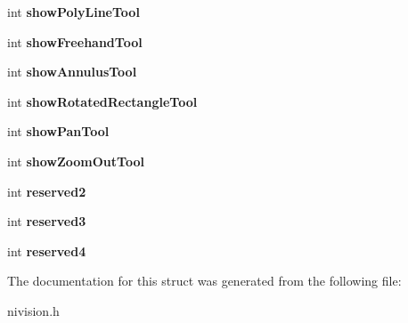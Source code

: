 \begin{DoxyCompactItemize}
\item 
\hypertarget{structToolWindowOptions__struct_a363b56639f1074bb9c0d30859b72bba9}{
int {\bfseries showPolyLineTool}}
\label{structToolWindowOptions__struct_a363b56639f1074bb9c0d30859b72bba9}

\item 
\hypertarget{structToolWindowOptions__struct_a50d8ae987ba26589c5ac7df4c20b1a47}{
int {\bfseries showFreehandTool}}
\label{structToolWindowOptions__struct_a50d8ae987ba26589c5ac7df4c20b1a47}

\item 
\hypertarget{structToolWindowOptions__struct_a818d68a1fcb94b2f2bc2099a53abfecc}{
int {\bfseries showAnnulusTool}}
\label{structToolWindowOptions__struct_a818d68a1fcb94b2f2bc2099a53abfecc}

\item 
\hypertarget{structToolWindowOptions__struct_a08ff2bd29eb520839c4fc6be913ba20b}{
int {\bfseries showRotatedRectangleTool}}
\label{structToolWindowOptions__struct_a08ff2bd29eb520839c4fc6be913ba20b}

\item 
\hypertarget{structToolWindowOptions__struct_a6fca2ae8b8d7bbdf0ba2c45d70758be8}{
int {\bfseries showPanTool}}
\label{structToolWindowOptions__struct_a6fca2ae8b8d7bbdf0ba2c45d70758be8}

\item 
\hypertarget{structToolWindowOptions__struct_a6a1418ca830f0f0148c002e68c2e0ae2}{
int {\bfseries showZoomOutTool}}
\label{structToolWindowOptions__struct_a6a1418ca830f0f0148c002e68c2e0ae2}

\item 
\hypertarget{structToolWindowOptions__struct_aff76139b693e2d080c8b847a6f09d99b}{
int {\bfseries reserved2}}
\label{structToolWindowOptions__struct_aff76139b693e2d080c8b847a6f09d99b}

\item 
\hypertarget{structToolWindowOptions__struct_a5e92c68cc34646918dbd86f8b2672c98}{
int {\bfseries reserved3}}
\label{structToolWindowOptions__struct_a5e92c68cc34646918dbd86f8b2672c98}

\item 
\hypertarget{structToolWindowOptions__struct_a6e348c178b3dc7defa4035974c77835b}{
int {\bfseries reserved4}}
\label{structToolWindowOptions__struct_a6e348c178b3dc7defa4035974c77835b}

\end{DoxyCompactItemize}


The documentation for this struct was generated from the following file:\begin{DoxyCompactItemize}
\item 
nivision.h\end{DoxyCompactItemize}

